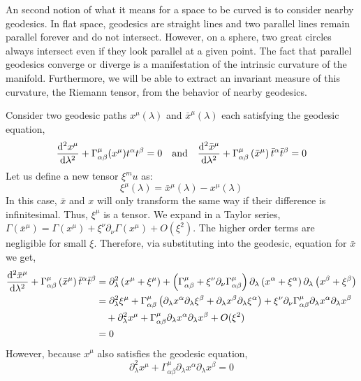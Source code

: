 \documentclass[11pt, a4paper]{article}
\begin{document}
An second notion of what it means for a space to be curved is to consider nearby geodesics. In flat space, geodesics are straight lines and two parallel lines remain parallel forever and do not intersect. However, on a sphere, two great circles always intersect even if they look parallel at a given point. The fact that parallel geodesics converge or diverge is a manifestation of the intrinsic curvature of the manifold. Furthermore, we will be able to extract an invariant measure of this curvature, the Riemann tensor, from the behavior of nearby geodesics.
\par 
Consider two geodesic paths $x^\mu(\lambda)$ and $\bar{x}^{\mu}(\lambda)$ each satisfying the geodesic equation, 
\[ \frac{\mathrm{d}^{2} x^\mu}{\mathrm{d}\lambda^{2}} +  \Gamma^\mu_{\alpha\beta}(x^\mu) t^\alpha t^\beta = 0 \quad \text{and} \quad  \frac{\mathrm{d}^{2} \bar{x}^\mu}{\mathrm{d}\lambda^{2}} + \Gamma^\mu_{\alpha\beta}\left(\bar{x}^\mu\right)\bar{t}^\alpha\bar{t}^\beta = 0\]
Let us define a new tensor $\xi^mu$ as:
\[\xi^\mu(\lambda) = \bar{x}^\mu(\lambda) -x^\mu(\lambda)\]
In this case, $\bar x$ and $x$ will only transform the same way if their difference is infinitesimal.  Thus, $\xi^\mu$ is a tensor.
We expand in a Taylor series, $\Gamma\left(\bar{x}^\mu\right) = \Gamma(x^\mu) + \xi^\nu \partial_\nu \Gamma(x^\mu) + O(\xi^2)$. The higher order terms are negligible for small $\xi$. Therefore, via substituting into the geodesic, equation for $\bar{x}$ we get,
\begin{align*}
\frac{\mathrm{d}^{2} \bar{x}^\mu}{\mathrm{d}\lambda^{2}} + \Gamma^\mu_{\alpha\beta}\left(\bar{x}^\mu\right)\bar{t}^\alpha\bar{t}^\beta 
&  = \partial_\lambda^2 \left(x^\mu + \xi^\mu\right) + \left(\Gamma^\mu_{\alpha\beta}+\xi^\nu \partial_\nu \Gamma^\mu_{\alpha\beta}\right) \partial_\lambda\left(x^\alpha + \xi^\alpha\right)\partial_\lambda\left(x^\beta + \xi^\beta\right)
\\
& = \partial_\lambda^2 \xi^\mu + \Gamma^\mu_{\alpha\beta}\left(\partial_\lambda x^\alpha \partial_\lambda \xi^\beta + \partial_\lambda x^\beta \partial_\lambda \xi^\alpha\right) + \xi^\nu \partial_\nu\Gamma^\mu_{\alpha\beta} \partial_\lambda x^\alpha \partial_\lambda x^\beta
\\
& \quad + \partial_\lambda^2 x^\mu  + \Gamma^\mu_{\alpha\beta} \partial_\lambda x^\alpha \partial_\lambda x^\beta + O(\xi^2)
\\
& = 0
\end{align*}
However, because $x^\mu$ also satisfies the geodesic equation,
\[ \partial_\lambda^2 x^\mu + \Gamma_{\alpha \beta}^\mu \partial_\lambda x^\alpha \partial_\lambda x^\beta = 0\]
\end{document}
